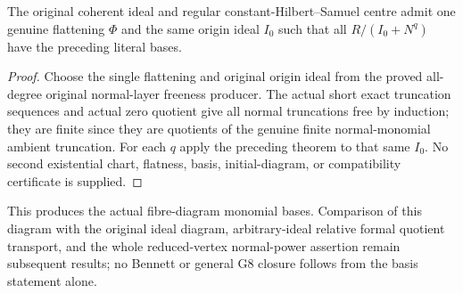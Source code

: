 \begin{theorem}
\label{hir:actual-original-centre-standard-monomial-bases}
\leanok
The original coherent ideal and regular constant-Hilbert--Samuel centre admit one genuine flattening $\Phi$ and the same origin ideal $I_0$ such that all $R/(I_0+N^q)$ have the preceding literal bases.
\end{theorem}
\begin{proof}
Choose the single flattening and original origin ideal from the proved all-degree original normal-layer freeness producer.
The actual short exact truncation sequences and actual zero quotient give all normal truncations free by induction; they are finite since they are quotients of the genuine finite normal-monomial ambient truncation.
For each $q$ apply the preceding theorem to that same $I_0$.
No second existential chart, flatness, basis, initial-diagram, or compatibility certificate is supplied.
\end{proof}

This produces the actual fibre-diagram monomial bases.
Comparison of this diagram with the original ideal diagram, arbitrary-ideal relative formal quotient transport, and the whole reduced-vertex normal-power assertion remain subsequent results; no Bennett or general G8 closure follows from the basis statement alone.
